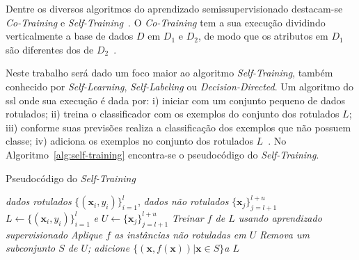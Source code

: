     Dentre os diversos algoritmos do aprendizado semissupervisionado destacam\hyp{se} \textit{Co\hyp{Training}} e \textit{Self\hyp{Training}}~\cite{zhu2008survey}. O \textit{Co\hyp{Training}} tem a sua execução dividindo verticalmente a base de dados $D$ em $D_1$ e $D_2$, de modo que os atributos em $D_1$ são diferentes dos de $D_2$~\cite{blum1998cotraining}.
    
    
    Neste trabalho será dado um foco maior ao algoritmo \textit{Self\hyp{Training}}, também conhecido por \textit{Self\hyp{Learning}}, \textit{Self\hyp{Labeling}} ou \textit{Decision\hyp{Directed}}. Um algoritmo do \ac{ssl} onde sua execução é dada por: i) iniciar com um conjunto pequeno de dados rotulados; ii) treina o classificador com os exemplos do conjunto dos rotulados $L$; iii) conforme suas previsões realiza a classificação dos exemplos que não possuem classe; iv) adiciona os exemplos no conjunto dos rotulados $L$~\cite{chapelle2006semi, grandvalet2005semi, zhu2009introduction}. No Algoritmo~\ref{alg:self-training} encontra-se o pseudocódigo do \textit{Self\hyp{Training}}.
	
    \begin{algorithm}[H]
        \caption{Pseudocódigo do \textit{Self\hyp{Training}}}
        \label{alg:self-training}
        \SetAlgoLined
        \begin{algorithmic}[1]
            \REQUIRE \textit{dados rotulados} $\{(\mathbf{x}_i, y_i)\}^l_{i = 1}$, \textit{dados não rotulados} $\{\mathbf{x}_j\}^{l+u}_{j=l+1}$
            \ENSURE $L \leftarrow \{(\mathbf{x}_i, y_i)\}^l_{i = 1}$ \textit{e} $U \leftarrow \{\mathbf{x}_j\}^{l+u}_{j = l+1}$
            \REPEAT
            	\STATE \textit{Treinar $f$ de $L$ usando aprendizado supervisionado}
            	\STATE \textit{Aplique $f$ as instâncias não rotuladas em $U$}
            	\STATE \textit{Remova um subconjunto $S$ de $U$; adicione $\{(\mathbf{x}, f(\mathbf{x}))|\mathbf{x}\in S\}$a $L$}
        \end{algorithmic}
    \end{algorithm}
	\begin{center}
        \vspace{-2em}
	\end{center}
	
